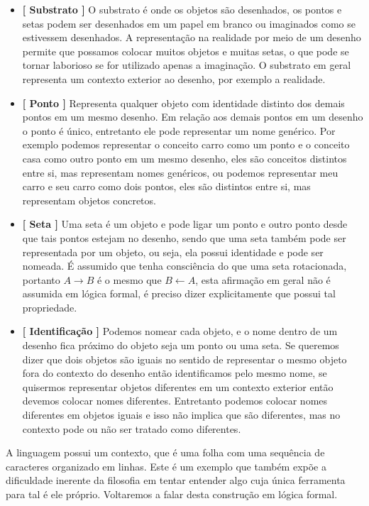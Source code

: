 \documentclass[10pt,a4paper]{report}
\begin{document}
\begin{itemize}
	\item[ (i) ] \textbf{[ Substrato ]} O substrato é onde os objetos são desenhados, os pontos e setas podem ser desenhados em um papel em branco ou imaginados como se estivessem desenhados. A representação na realidade por meio de um desenho permite que possamos colocar muitos objetos e muitas setas, o que pode se tornar laborioso se for utilizado apenas a imaginação. O substrato em geral representa um contexto exterior ao desenho, por exemplo a realidade.
	\item[ (ii) ] \textbf{[ Ponto ]} Representa qualquer objeto com identidade distinto dos demais pontos em um mesmo desenho. Em relação aos demais pontos em um desenho o ponto é único, entretanto ele pode representar um nome genérico. Por exemplo podemos representar o conceito carro como um ponto e o conceito casa como outro ponto em um mesmo desenho, eles são conceitos distintos entre si, mas representam nomes genéricos, ou podemos representar meu carro e seu carro como dois pontos, eles são distintos entre si, mas representam objetos concretos.
	\item[ (iii) ] \textbf{[ Seta ]} Uma seta é um objeto e pode ligar um ponto e outro ponto desde que tais pontos estejam no desenho, sendo que uma seta também pode ser representada por um objeto, ou seja, ela possui identidade e pode ser nomeada. É assumido que tenha consciência do que uma seta rotacionada, portanto $A \rightarrow B$ é o mesmo que $B \leftarrow A$, esta afirmação em geral não é assumida em lógica formal, é preciso dizer explicitamente que possui tal propriedade.
	\item[ (iv)  ] \textbf{[ Identificação ]} Podemos nomear cada objeto, e o nome dentro de um desenho fica próximo do objeto seja um ponto ou uma seta. Se queremos dizer que dois objetos são iguais no sentido de representar o mesmo objeto fora do contexto do desenho então identificamos pelo mesmo nome, se quisermos representar objetos diferentes em um contexto exterior então devemos colocar nomes diferentes. Entretanto podemos colocar nomes diferentes em objetos iguais e isso não implica que são diferentes, mas no contexto pode ou não ser tratado como diferentes.
\end{itemize}

A linguagem possui um contexto, que é uma folha com uma sequência de caracteres organizado em linhas. Este é um exemplo que também expõe a dificuldade inerente da filosofia em tentar entender algo cuja única ferramenta para tal é ele próprio. Voltaremos a falar desta construção em lógica formal.\\
\end{document}
